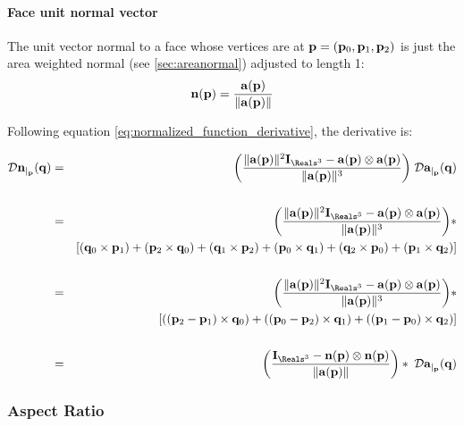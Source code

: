 
\paragraph{Face unit normal vector}
\label{sec:facenormal}

The unit vector normal to a face whose vertices are at
${\mathbf p} = ({\mathbf p}_0,{\mathbf p}_1,{\mathbf p}_2)$ is just the area weighted normal (see \autoref{sec:areanormal})
adjusted to length 1:
\begin{equation}
{\mathbf n}({\mathbf p})  =  {{{\mathbf a}({\mathbf p})} \over {\| {\mathbf a}({\mathbf p}) \|}}
\end{equation}

Following equation \ref{eq:normalized_function_derivative}, the derivative is:

\begin{eqnarray}
\label{eq:unit_normal_derivative}
\Dc{\n}{\p}{\q}
&  =
& { \left( {\| \a(\p) \|^2 \I_{\Reals^3}  -  \a(\p) \otimes \a(\p) } \over {\| \a(\p) \|^3} \right) }
\; \Dc{\a}{\p}{\q}
 \\
& & \nonumber\\
&  =
& { \left( {\| \a(\p) \|^2 \I_{\Reals^3}  -  \a(\p) \otimes \a(\p) } \over {\| \a(\p) \|^3} \right)} \ast
\nonumber \\
&    &
\left[ \left( \q_0 \times \p_1 \right) + \left( \p_2 \times \q_0 \right)
+
\left( \q_1 \times \p_2 \right) + \left( \p_0 \times \q_1 \right)
+
\left( \q_2 \times \p_0 \right) + \left( \p_1 \times \q_2 \right) \right]
\nonumber \\
& & \nonumber\\
&  =
& { \left( {\| \a(\p) \|^2 \I_{\Reals^3}  -  \a(\p) \otimes \a(\p) } \over {\| \a(\p) \|^3} \right)} \ast
\nonumber \\
&    &
\left[ \left( (\p_2 - \p_1) \times \q_0 \right)
+
\left( (\p_0 - \p_2) \times \q_1 \right)
+
\left( (\p_1 - \p_0) \times \q_2 \right) \right]
\nonumber \\
& & \nonumber\\
&  =
& { \left( {\I_{\Reals^3}  -  \n(\p) \otimes \n(\p) } \over {\| \a(\p) \|} \right)} \ast \; \Dc{\a}{\p}{\q}
\nonumber
\end{eqnarray}


\subsubsection{Aspect Ratio}
\label{sec:aspect_ratio}

